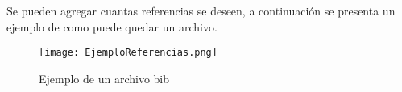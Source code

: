 \documentclass{article}
\begin{document}
Se pueden agregar cuantas referencias se deseen, a continuación se presenta un ejemplo de como puede quedar un archivo.
\begin{figure}[h]
    \centering
    \texttt{[image: EjemploReferencias.png]}
    \caption{Ejemplo de un archivo bib}
    \label{fig:EjemploReferencias}
\end{figure}
\newpage
\nocite{*}  %
\printbibliography
\end{document}
